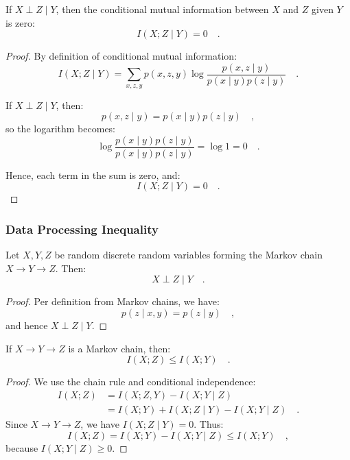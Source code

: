 \documentclass[../../main.tex]{subfiles}
\begin{document}
\begin{proposition}
    If \( X \perp Z \mid Y \), then the conditional mutual information between \( X \) and \( Z \) given \( Y \) is zero:
    \[
        I(X; Z \mid Y) = 0 \quad .
    \]
\end{proposition}

\begin{proof}
By definition of conditional mutual information:
    \[
        I(X; Z \mid Y) = \sum_{x, z, y} p(x, z, y) \log \frac{p(x, z \mid y)}{p(x \mid y) p(z \mid y)} \quad .
    \]

    If \( X \perp Z \mid Y \), then:
    \[
        p(x, z \mid y) = p(x \mid y) p(z \mid y) \quad ,
    \]
    so the logarithm becomes:
    \[
        \log \frac{p(x \mid y) p(z \mid y)}{p(x \mid y) p(z \mid y)} = \log 1 = 0 \quad .
    \]

    Hence, each term in the sum is zero, and:
    \[
        I(X; Z \mid Y) = 0 \quad .
    \]
\end{proof}

\pagebreak
\subsubsection{Data Processing Inequality}

\begin{lemma}
    Let \( X, Y, Z \) be random discrete random variables forming the Markov chain $X \to Y \to Z$. Then:
    \[
        X \perp Z \mid Y \quad .
    \]
\end{lemma}
\begin{proof}
    Per definition from Markov chains, we have:
    \[
        p(z \mid x, y) = p(z \mid y) \quad ,
    \]
    and hence $X \perp Z \mid Y$.
\end{proof}

\begin{theorem}
    \label{theorem:data_processing_inequality}
    If \( X \to Y \to Z \) is a Markov chain, then:
    \[
        I(X; Z) \leq I(X; Y) \quad .
    \]
\end{theorem}

\begin{proof}
    We use the chain rule and conditional independence:
    \begin{align*}
        I(X; Z) &= I(X; Z, Y) - I(X; Y \mid Z) \\
        &= I(X; Y) + I(X; Z \mid Y) - I(X; Y \mid Z) \quad .
    \end{align*}
    Since \( X \to Y \to Z \), we have \( I(X; Z \mid Y) = 0 \). Thus:
    \[
        I(X; Z) = I(X; Y) - I(X; Y \mid Z) \leq I(X; Y) \quad ,
    \]
    because \( I(X; Y \mid Z) \geq 0 \).
\end{proof}
\end{document}
